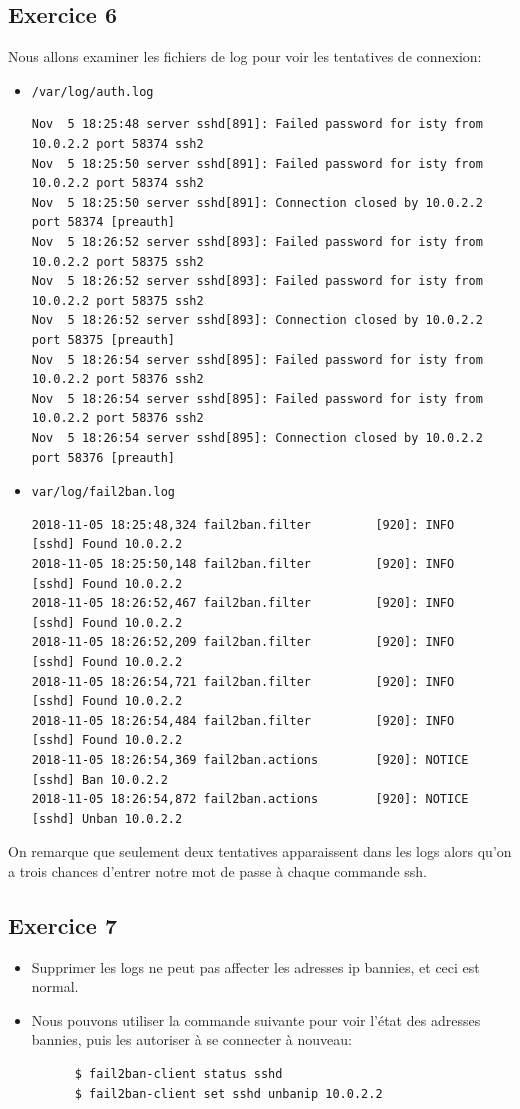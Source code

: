 \documentclass{report}
\begin{document}
\subsection{Exercice 6}
Nous allons examiner les fichiers de log pour voir les tentatives de connexion:
\begin{itemize}
  \item \texttt{/var/log/auth.log}
    \begin{verbatim}
Nov  5 18:25:48 server sshd[891]: Failed password for isty from 10.0.2.2 port 58374 ssh2
Nov  5 18:25:50 server sshd[891]: Failed password for isty from 10.0.2.2 port 58374 ssh2
Nov  5 18:25:50 server sshd[891]: Connection closed by 10.0.2.2 port 58374 [preauth]
Nov  5 18:26:52 server sshd[893]: Failed password for isty from 10.0.2.2 port 58375 ssh2
Nov  5 18:26:52 server sshd[893]: Failed password for isty from 10.0.2.2 port 58375 ssh2
Nov  5 18:26:52 server sshd[893]: Connection closed by 10.0.2.2 port 58375 [preauth]
Nov  5 18:26:54 server sshd[895]: Failed password for isty from 10.0.2.2 port 58376 ssh2
Nov  5 18:26:54 server sshd[895]: Failed password for isty from 10.0.2.2 port 58376 ssh2
Nov  5 18:26:54 server sshd[895]: Connection closed by 10.0.2.2 port 58376 [preauth]

    \end{verbatim}
  \item \texttt{var/log/fail2ban.log}
      \begin{verbatim}
2018-11-05 18:25:48,324 fail2ban.filter         [920]: INFO    [sshd] Found 10.0.2.2
2018-11-05 18:25:50,148 fail2ban.filter         [920]: INFO    [sshd] Found 10.0.2.2
2018-11-05 18:26:52,467 fail2ban.filter         [920]: INFO    [sshd] Found 10.0.2.2
2018-11-05 18:26:52,209 fail2ban.filter         [920]: INFO    [sshd] Found 10.0.2.2
2018-11-05 18:26:54,721 fail2ban.filter         [920]: INFO    [sshd] Found 10.0.2.2
2018-11-05 18:26:54,484 fail2ban.filter         [920]: INFO    [sshd] Found 10.0.2.2
2018-11-05 18:26:54,369 fail2ban.actions        [920]: NOTICE  [sshd] Ban 10.0.2.2
2018-11-05 18:26:54,872 fail2ban.actions        [920]: NOTICE  [sshd] Unban 10.0.2.2
      \end{verbatim}
  \end{itemize}
On remarque que seulement deux tentatives apparaissent dans les logs alors qu'on a trois chances
d'entrer notre mot de passe à chaque commande ssh.

\subsection{Exercice 7}
\begin{itemize}
  \item Supprimer les logs ne peut pas affecter les adresses ip bannies, et ceci est normal.
  \item Nous pouvons utiliser la commande suivante pour voir l'état des adresses bannies, puis les
  autoriser à se connecter à nouveau:
  \begin{tcolorbox}
    \begin{verbatim}
      $ fail2ban-client status sshd
      $ fail2ban-client set sshd unbanip 10.0.2.2
    \end{verbatim}
  \end{tcolorbox}
\end{itemize}
\end{document}
